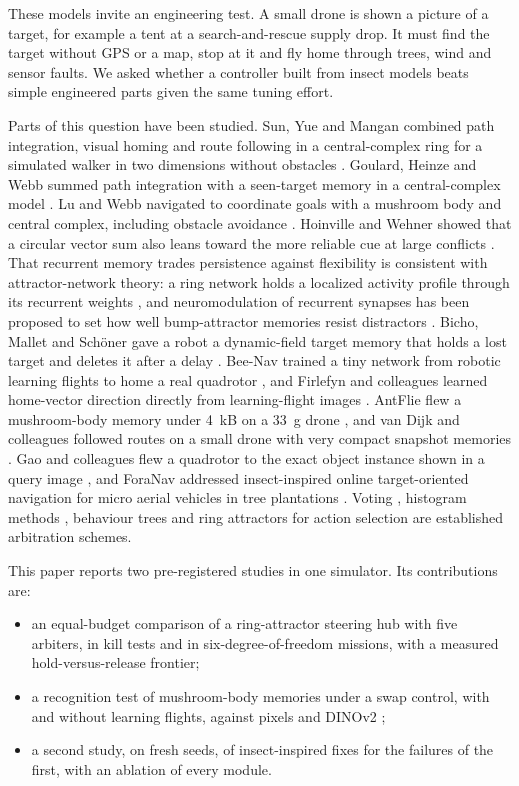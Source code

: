 \documentclass[10pt,twocolumn]{article}
\begin{document}
These models invite an engineering test. A small drone is shown a picture of a target, for example a tent at a search-and-rescue supply drop. It must find the target without GPS or a map, stop at it and fly home through trees, wind and sensor faults. We asked whether a controller built from insect models beats simple engineered parts given the same tuning effort.

Parts of this question have been studied. Sun, Yue and Mangan combined path integration, visual homing and route following in a central-complex ring for a simulated walker in two dimensions without obstacles \citep{sun2020}. Goulard, Heinze and Webb summed path integration with a seen-target memory in a central-complex model \citep{goulard2023}. Lu and Webb navigated to coordinate goals with a mushroom body and central complex, including obstacle avoidance \citep{lu2026}. Hoinville and Wehner showed that a circular vector sum also leans toward the more reliable cue at large conflicts \citep{hoinville2018}. That recurrent memory trades persistence against flexibility is consistent with attractor-network theory: a ring network holds a localized activity profile through its recurrent weights \citep{zhang1996}, and neuromodulation of recurrent synapses has been proposed to set how well bump-attractor memories resist distractors \citep{compte2000}. Bicho, Mallet and Schöner gave a robot a dynamic-field target memory that holds a lost target and deletes it after a delay \citep{bicho2000}. Bee-Nav trained a tiny network from robotic learning flights to home a real quadrotor \citep{beenav2026}, and Firlefyn and colleagues learned home-vector direction directly from learning-flight images \citep{firlefyn2024}. AntFlie flew a mushroom-body memory under 4~kB on a 33~g drone \citep{antflie2026}, and van Dijk and colleagues followed routes on a small drone with very compact snapshot memories \citep{vandijk2024}. Gao and colleagues flew a quadrotor to the exact object instance shown in a query image \citep{gao2026}, and ForaNav addressed insect-inspired online target-oriented navigation for micro aerial vehicles in tree plantations \citep{foranav2025}. Voting \citep{rosenblatt1997}, histogram methods \citep{borenstein1991}, behaviour trees \citep{colledanchise2018} and ring attractors for action selection \citep{negre2025} are established arbitration schemes.

This paper reports two pre-registered studies in one simulator. Its contributions are:
\begin{itemize}
\item an equal-budget comparison of a ring-attractor steering hub with five arbiters, in kill tests and in six-degree-of-freedom missions, with a measured hold-versus-release frontier;
\item a recognition test of mushroom-body memories under a swap control, with and without learning flights, against pixels and DINOv2 \citep{dinov22023};
\item a second study, on fresh seeds, of insect-inspired fixes for the failures of the first, with an ablation of every module.
\end{itemize}
\end{document}

